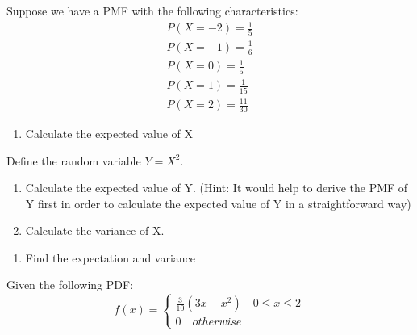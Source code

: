 \documentclass[
]{book}
\begin{document}
\begin{exercise}
\protect\hypertarget{exr:expvar}{}\label{exr:expvar}

Suppose we have a PMF with the following characteristics:
\begin{eqnarray*}
  P(X = -2) = \frac{1}{5}\\
  P(X = -1) = \frac{1}{6}\\
  P(X = 0) = \frac{1}{5}\\
  P(X = 1) = \frac{1}{15}\\
  P(X = 2) = \frac{11}{30}
\end{eqnarray*}

\begin{enumerate}
\def\labelenumi{\arabic{enumi}.}
\tightlist
\item
  Calculate the expected value of X
\end{enumerate}

Define the random variable \(Y = X^2\).

\begin{enumerate}
\def\labelenumi{\arabic{enumi}.}
\setcounter{enumi}{1}
\item
  Calculate the expected value of Y. (Hint: It would help to derive the PMF of Y first in order to calculate the expected value of Y in a straightforward way)
\item
  Calculate the variance of X.
\end{enumerate}

\end{exercise}

\begin{exercise}
\protect\hypertarget{exr:expvar2}{}\label{exr:expvar2}

\begin{enumerate}
\def\labelenumi{\arabic{enumi}.}
\tightlist
\item
  Find the expectation and variance
\end{enumerate}

Given the following PDF:
\[f(x) =  \begin{cases}
              \frac{3}{10}(3x - x^2) \quad 0 \leq x \leq 2\\
               0 \quad otherwise
            \end{cases}
               \]

\end{exercise}
\end{document}
